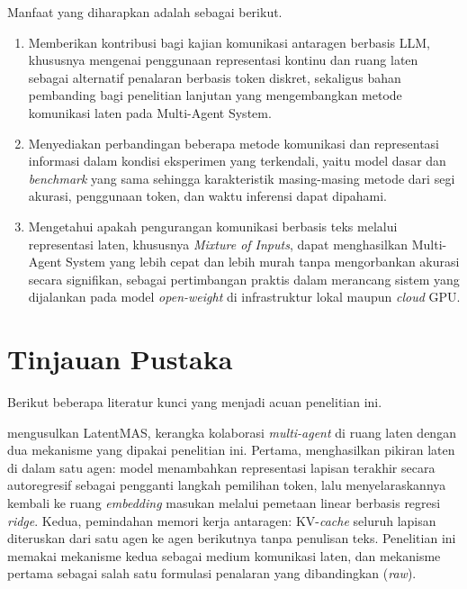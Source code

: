 Manfaat yang diharapkan adalah sebagai berikut.

\begin{enumerate}
    \item Memberikan kontribusi bagi kajian komunikasi antaragen berbasis LLM,
          khususnya mengenai penggunaan representasi kontinu dan ruang laten
          sebagai alternatif penalaran berbasis token diskret, sekaligus
          bahan pembanding bagi penelitian lanjutan yang mengembangkan metode
          komunikasi laten pada Multi-Agent System.
    \item Menyediakan perbandingan beberapa metode komunikasi dan representasi
          informasi dalam kondisi eksperimen yang terkendali, yaitu model dasar
          dan \textit{benchmark} yang sama sehingga karakteristik
          masing-masing metode dari segi akurasi, penggunaan token, dan waktu
          inferensi dapat dipahami.
    \item Mengetahui apakah pengurangan komunikasi berbasis teks melalui
          representasi laten, khususnya \textit{Mixture of Inputs}, dapat
          menghasilkan Multi-Agent System yang lebih cepat dan lebih murah
          tanpa mengorbankan akurasi secara signifikan, sebagai pertimbangan
          praktis dalam merancang sistem yang dijalankan pada model
          \textit{open-weight} di infrastruktur lokal maupun \textit{cloud}
          GPU.
\end{enumerate}

\section{Tinjauan Pustaka}

Berikut beberapa literatur kunci yang menjadi acuan penelitian ini.

\citet{latentmas} mengusulkan LatentMAS, kerangka kolaborasi
\textit{multi-agent} di ruang laten dengan dua mekanisme yang dipakai
penelitian ini. Pertama, menghasilkan pikiran laten di dalam satu agen: model
menambahkan representasi lapisan terakhir secara autoregresif sebagai pengganti
langkah pemilihan token, lalu menyelaraskannya kembali ke ruang \textit{embedding}
masukan melalui pemetaan linear berbasis regresi \textit{ridge}. Kedua,
pemindahan memori kerja antaragen: KV-\textit{cache} seluruh lapisan diteruskan
dari satu agen ke agen berikutnya tanpa penulisan teks. Penelitian ini memakai
mekanisme kedua sebagai medium komunikasi laten, dan mekanisme pertama sebagai
salah satu formulasi penalaran yang dibandingkan (\textit{raw}).

